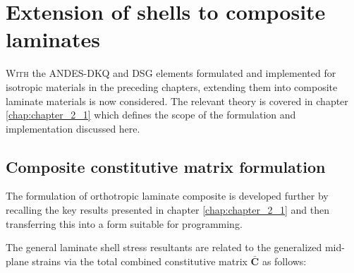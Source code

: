 



\chapter{Extension of shells to composite laminates}
\label{chap:chapter_composite_formulation_implementation}

\renewcommand{\Thema}{Extension of shells to composite laminates}

\lettrine[lines=2]{W}{ith} the ANDES-DKQ and DSG elements formulated and implemented for isotropic materials in the preceding chapters, extending them into composite laminate materials is now considered. The relevant theory is covered in chapter \ref{chap:chapter_2_1} which defines the scope of the formulation and implementation discussed here.

\section{Composite constitutive matrix formulation}
The formulation of orthotropic laminate composite is developed further by recalling the key results presented in chapter \ref{chap:chapter_2_1} and then transferring this into a form suitable for programming.

The general laminate shell stress resultants are related to the generalized mid-plane strains via the total combined constitutive matrix $\bar{\mathbf{C}}$ as follows:

